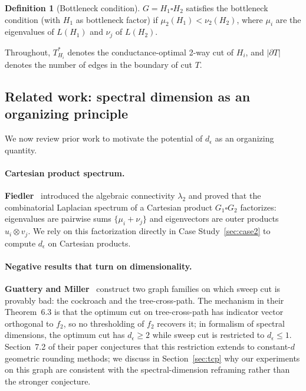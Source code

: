 \documentclass{article}
\theoremstyle{definition}
\newtheorem{definition}{Definition}
\theoremstyle{remark}
\begin{document}
\begin{definition}[Bottleneck condition]
\label{def:bottleneck}
$G = H_1 \square H_2$ satisfies the bottleneck condition (with $H_1$ as bottleneck factor) if $\mu_2(H_1) < \nu_2(H_2)$, where $\mu_i$ are the eigenvalues of $L(H_1)$ and $\nu_j$ of $L(H_2)$.
\end{definition}

Throughout, $T^*_{H_i}$ denotes the conductance-optimal 2-way cut of $H_i$, and $|\partial T|$ denotes the number of edges in the boundary of cut $T$.

\subsection{Related work: spectral dimension as an organizing principle}
\label{sec:related}

We now review prior work to motivate the potential of $d_\epsilon$ as an organizing quantity.

\paragraph{Cartesian product spectrum.} \textbf{Fiedler}~\cite{fiedler1973algebraic} introduced the algebraic connectivity $\lambda_2$ and proved that the combinatorial Laplacian spectrum of a Cartesian product $G_1 \square G_2$ factorizes: eigenvalues are pairwise sums $\{\mu_i + \nu_j\}$ and eigenvectors are outer products $u_i \otimes v_j$. We rely on this factorization directly in Case Study~\ref{sec:case2} to compute $d_\epsilon$ on Cartesian products.

\paragraph{Negative results that turn on dimensionality.} \textbf{Guattery and Miller}~\cite{guattery1998quality} construct two graph families on which sweep cut is provably bad: the cockroach and the tree-cross-path. The mechanism in their Theorem~6.3 is that the optimum cut on tree-cross-path has indicator vector orthogonal to $f_2$, so no thresholding of $f_2$ recovers it; in formalism of spectral dimensions, the optimum cut has $d_\epsilon \geq 2$ while sweep cut is restricted to $d_\epsilon \leq 1$. Section~7.2 of their paper conjectures that this restriction extends to constant-$d$ geometric rounding methods; we discuss in Section~\ref{sec:tcp} why our experiments on this graph are consistent with the spectral-dimension reframing rather than the stronger conjecture.
\end{document}
